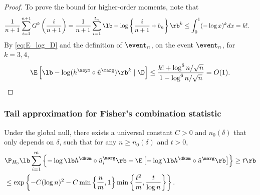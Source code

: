 \begin{proof}
  To prove the bound for higher-order moments, note that
  \begin{align*}
    \frac{1}{n+1}\sum_{i=1}^{n+1}G^k\left(\frac{i}{n+1}\right) &= \frac{1}{n+1}\sum_{i=1}^{t_n} \lb -\log \left\{\frac{i}{n+1} + b_n\right\}\rb^{k} \le \int_{0}^{1}(-\log x)^k dx = k!.
  \end{align*}
  By \eqref{eq:E_log_D} and the definition of $\event_{n}$, on the event $\event_{n}$, for $k = 3,4$,
  \[\E\left[\lb -\log (h^\asym \circ \hat{u}^\marg)\rb^{k}\mid \D\right]\le \frac{k! + \log^6 n / \sqrt{n}}{1 - \log^6 n / \sqrt{n}} = O(1).\]
\end{proof}

\subsubsection{Tail approximation for Fisher's combination statistic}
\begin{lemma}\label{lem:fisher_dkwm_tail}
  Under the global null, there exists a universal constant $C > 0$ and $n_0(\delta)$ that only depends on $\delta$, such that for any $n\ge n_0(\delta)$ and $t > 0$,
  \begin{align*}
    &\P_{H_0}\lb \sum_{i=1}^{m}\left\{-\log\lb h^{\dkwm} \circ \hat{u}^\marg_i\rb - \E\left[-\log\lb h^{\dkwm} \circ \hat{u}^\marg\rb\right]\right\}\ge t\rb\\
    & \le \exp\left\{-C(\log n)^2 - C\min\left\{\frac{n}{m}, 1\right\}\min\left\{\frac{t^2}{m}, \frac{t}{\log n}\right\}\right\}.
  \end{align*}
\end{lemma}
